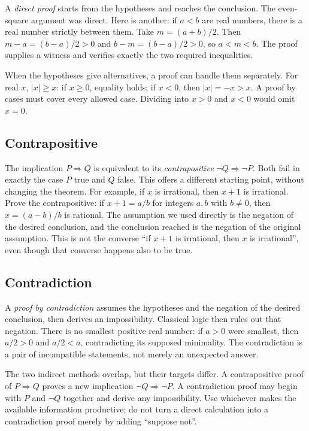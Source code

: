 A \emph{direct proof} starts from the hypotheses and reaches the conclusion.
The even-square argument was direct. Here is another: if $a<b$ are real numbers,
there is a real number strictly between them. Take $m=(a+b)/2$. Then
$m-a=(b-a)/2>0$ and $b-m=(b-a)/2>0$, so $a<m<b$.
The proof supplies a witness and verifies exactly the two required inequalities.

When the hypotheses give alternatives, a proof can handle them separately. For
real $x$, $|x|\ge x$: if $x\ge0$, equality holds; if $x<0$, then
$|x|=-x>x$. A proof by cases must cover every allowed case. Dividing into
$x>0$ and $x<0$ would omit $x=0$.

\subsection*{Contrapositive}

The implication $P\Rightarrow Q$ is equivalent to its \emph{contrapositive}
$\neg Q\Rightarrow\neg P$. Both fail in exactly the case $P$ true and $Q$ false.
This offers a different starting point, without changing the theorem.
For example, if $x$ is irrational, then $x+1$ is irrational. Prove the
contrapositive: if $x+1=a/b$ for integers $a,b$ with $b\ne0$, then
$x=(a-b)/b$ is rational. The assumption we used directly is the negation of
the desired conclusion, and the conclusion reached is the negation of the
original assumption. This is not the converse ``if $x+1$ is irrational, then
$x$ is irrational'', even though that converse happens also to be true.

\subsection*{Contradiction}

A \emph{proof by contradiction} assumes the hypotheses and the negation of
the desired conclusion, then derives an impossibility. Classical logic then
rules out that negation. There is no smallest positive real number: if $a>0$
were smallest, then $a/2>0$ and $a/2<a$, contradicting its supposed minimality.
The contradiction is a pair of incompatible statements, not merely an unexpected answer.

The two indirect methods overlap, but their targets differ. A contrapositive proof
of $P\Rightarrow Q$ proves a new implication $\neg Q\Rightarrow\neg P$.
A contradiction proof may begin with $P$ and $\neg Q$ together and derive any
impossibility. Use whichever makes the available information productive; do not
turn a direct calculation into a contradiction proof merely by adding ``suppose not''.

